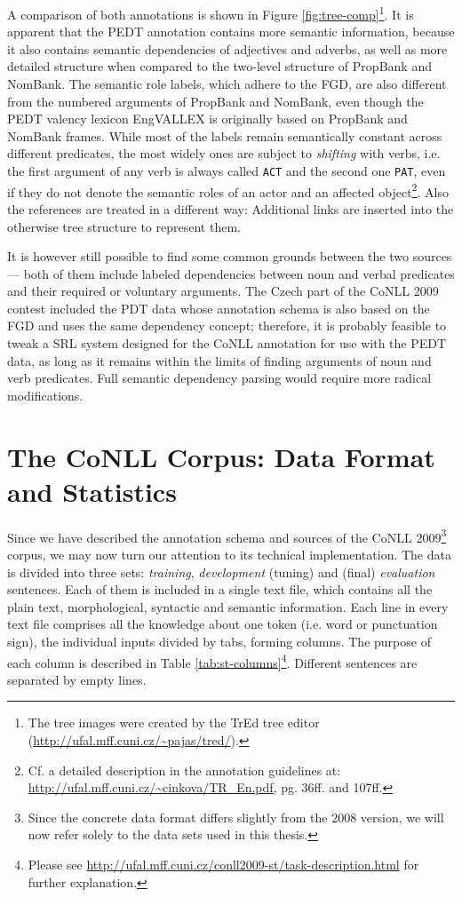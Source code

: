\documentclass[12pt,notitlepage]{report}
\begin{document}
A comparison of both annotations is shown in Figure \ref{fig:tree-comp}\footnote{The tree images were created by the TrEd tree editor\\(\url{http://ufal.mff.cuni.cz/\~pajas/tred/}).}. It is apparent that the PEDT annotation contains more semantic information, because it also contains semantic dependencies of adjectives and adverbs, as well as more detailed structure when compared to the two-level structure of PropBank and NomBank. The semantic role labels, which adhere to the FGD, are also different from the numbered arguments of PropBank and NomBank, even though the PEDT valency lexicon EngVALLEX \citep{semecky06} is originally based on PropBank and NomBank frames. While most of the labels remain semantically constant across different predicates, the most widely ones are subject to \emph{shifting} with verbs, i.e. the first argument of any verb is always called \texttt{ACT} and the second one \texttt{PAT}, even if they do not denote the semantic roles of an actor and an affected object\footnote{Cf. a detailed description in the annotation guidelines at: \\ \url{http://ufal.mff.cuni.cz/\~cinkova/TR\_En.pdf}, pg. 36ff. and 107ff.}. Also the references are treated in a different way: Additional links are inserted into the otherwise tree structure to represent them.

It is however still possible to find some common grounds between the two sources --- both of them include labeled dependencies between noun and verbal predicates and their required or voluntary arguments. The Czech part of the CoNLL 2009 contest included the PDT data whose annotation schema is also based on the FGD and uses the same dependency concept; therefore, it is probably feasible to tweak a SRL system designed for the CoNLL annotation for use with the PEDT data, as long as it remains within the limits of finding arguments of noun and verb predicates. Full semantic dependency parsing would require more radical modifications.

\section{The CoNLL Corpus: Data Format and Statistics}\label{data-format}

Since we have described the annotation schema and sources of the CoNLL 2009\footnote{Since the concrete data format differs slightly from the 2008 version, we will now refer solely to the data sets used in this thesis.} corpus, we may now turn our attention to its technical implementation. The data is divided into three sets: \emph{training}, \emph{development} (tuning) and (final) \emph{evaluation} sentences. Each of them is included in a single text file, which contains all the plain text, morphological, syntactic and semantic information. Each line in every text file comprises all the knowledge about one token (i.e. word or punctuation sign), the individual inputs divided by tabs, forming columns. The purpose of each column is described in Table \ref{tab:st-columns}\footnote{Please see \url{http://ufal.mff.cuni.cz/conll2009-st/task-description.html} for further explanation.}. Different sentences are separated by empty lines.
\end{document}

